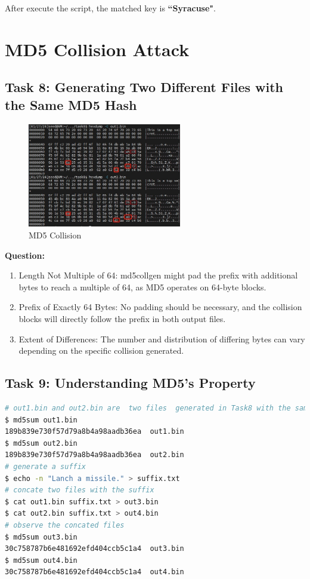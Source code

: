 \documentclass[a4paper]{article}
\begin{document}
After execute the script, the matched key is \textbf{``Syracuse"}.

\section{MD5 Collision Attack}
\subsection{Task 8: Generating Two Different Files with the Same MD5 Hash}
\begin{figure}[h]
    \centering
       \includegraphics[width=0.6\textwidth]{figures/task8/md5coll.png}
    \caption{MD5 Collision}\label{fig:task8}
\end{figure}
\textbf{Question:}
\begin{enumerate}
    \item Length Not Multiple of 64: md5collgen might pad the prefix with additional bytes to reach a multiple of 64, as MD5 operates on 64-byte blocks.
    \item Prefix of Exactly 64 Bytes: No padding should be necessary, and the collision blocks will directly follow the prefix in both output files.
    \item Extent of Differences: The number and distribution of differing bytes can vary depending on the specific collision generated.
\end{enumerate}

\subsection{Task 9: Understanding MD5’s Property}
\begin{lstlisting}[caption={MD5 Property test script},label={lst:task3.9},language=BASH,breaklines=true]
# out1.bin and out2.bin are  two files  generated in Task8 with the same MD5 hash:
$ md5sum out1.bin
189b839e730f57d79a8b4a98aadb36ea  out1.bin
$ md5sum out2.bin
189b839e730f57d79a8b4a98aadb36ea  out2.bin
# generate a suffix
$ echo -n "Lanch a missile." > suffix.txt
# concate two files with the suffix
$ cat out1.bin suffix.txt > out3.bin
$ cat out2.bin suffix.txt > out4.bin
# observe the concated files
$ md5sum out3.bin
30c758787b6e481692efd404ccb5c1a4  out3.bin
$ md5sum out4.bin
30c758787b6e481692efd404ccb5c1a4  out4.bin
\end{lstlisting} 
\end{document}
